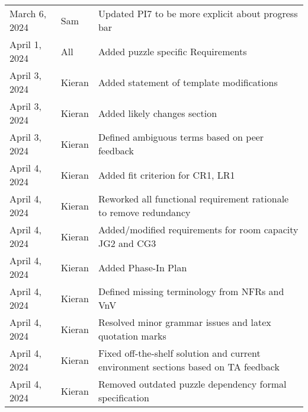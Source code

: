 \documentclass[12pt]{article}
\begin{document}
\begin{table}[hp]
\begin{tabularx}{\textwidth}{llX}
            March 6, 2024 & Sam & Updated PI7 to be more explicit about progress bar\\
            April 1, 2024 & All & Added puzzle specific Requirements\\
            April 3, 2024 & Kieran & Added statement of template modifications\\
            April 3, 2024 & Kieran & Added likely changes section\\
            April 3, 2024 & Kieran & Defined ambiguous terms based on peer feedback\\
            April 4, 2024 & Kieran & Added fit criterion for CR1, LR1\\
            April 4, 2024 & Kieran & Reworked all functional requirement rationale to remove redundancy\\
            April 4, 2024 & Kieran & Added/modified requirements for room capacity JG2 and CG3\\
            April 4, 2024 & Kieran & Added Phase-In Plan\\
            April 4, 2024 & Kieran & Defined missing terminology from NFRs and VnV\\
            April 4, 2024 & Kieran & Resolved minor grammar issues and latex quotation marks\\
            April 4, 2024 & Kieran & Fixed off-the-shelf solution and current environment sections based on TA feedback\\
            April 4, 2024 & Kieran & Removed outdated puzzle dependency formal specification\\
		\bottomrule
	\end{tabularx}
\end{table}

~\newpage

\end{document}
